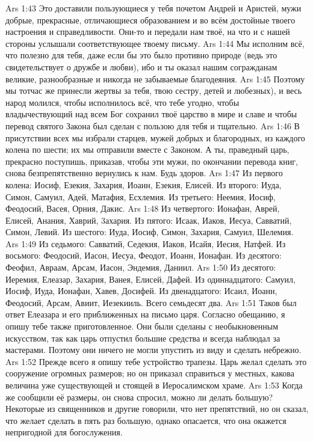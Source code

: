 \vs Ars 1:43
Это доставили пользующиеся у тебя почетом Андрей и Аристей, мужи добрые, прекрасные, отличающиеся образованием и во всём достойные твоего настроения и справедливости. Они-то и передали нам твоё, на что и с нашей стороны услышали соответствующее твоему письму.
\vs Ars 1:44
Мы исполним всё, что полезно для тебя, даже если бы это было противно природе (ведь это свидетельствует о дружбе и любви), ибо и ты оказал нашим согражданам великие, разнообразные и никогда не забываемые благодеяния.
\vs Ars 1:45
Поэтому мы тотчас же принесли жертвы за тебя, твою сестру, детей и любезных), и весь народ молился, чтобы исполнилось всё, что тебе угодно, чтобы владычествующий над всем Бог сохранил твоё царство в мире и славе и чтобы перевод святого Закона был сделан с пользою для тебя и тщательно.
\vs Ars 1:46
В присутствии всех мы избрали старцев, мужей добрых и благородных, из каждого колена по шести; их мы отправили вместе с Законом. А ты, праведный царь, прекрасно поступишь, приказав, чтобы эти мужи, по окончании перевода книг, снова безпрепятственно вернулись к нам. Будь здоров.
\vs Ars 1:47
Из первого колена: Иосиф, Езекия, Захария, Иоанн, Езекия, Елисей.
Из второго: Иуда, Симон, Самуил, Адей, Матафия, Есхлемия.
Из третьего: Неемия, Иосиф, Феодосий, Васея, Орния, Дакис.
\vs Ars 1:48
Из четвертого: Ионафан, Аврей, Елисей, Анания, Хаврий, 3ахария.
Из пятого: Исаак, Иаков, Иесуа, Савватий, Симон, Левий.
Из шестого: Иуда, Иосиф, Симон, Захария, Самуил, Шелемия.
\vs Ars 1:49
Из седьмого: Савватий, Седекия, Иаков, Исайя, Иесия, Натфей.
Из восьмого: Феодосий, Иасон, Иесуа, Феодот, Иоанн, Ионафан.
Из десятого: Феофил, Авраам, Арсам, Иасон, Эндемия, Даниил.
\vs Ars 1:50
Из десятого: Иеремия, Елеазар, Захария, Ванея, Елисей, Дафей.
Из одиннадцатого: Самуил, Иосиф, Иуда, Ионафан, Хавев, Досифей.
Из двенадцатого: Исаил, Иоанн, Феодосий, Арсам, Авиит, Иезекииль.
Всего семьдесят два.
\vs Ars 1:51
Таков был ответ Елеазара и его приближенных на письмо царя.
Согласно обещанию, я опишу тебе также приготовленное. Они были сделаны с необыкновенным искусством, так как царь отпустил большие средства и всегда наблюдал за мастерами. Поэтому они ничего не могли упустить из виду и сделать небрежно.
\vs Ars 1:52
Прежде всего я опишу тебе устройство трапезы. Царь желал сделать это сооружение огромных размеров; но он приказал справиться у местных, какова величина уже существующей и стоящей в Иеросалимском храме.
\vs Ars 1:53
Когда же сообщили её размеры, он снова спросил, можно ли делать большую? Некоторые из священников и другие говорили, что нет препятствий, но он сказал, что желает сделать в пять раз большую, однако опасается, что она окажется непригодной для богослужения.
